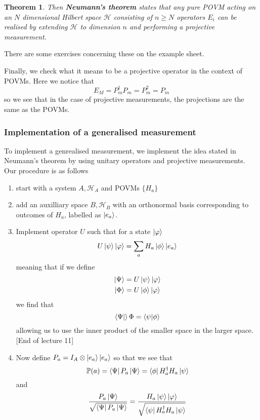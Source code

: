 \documentclass{article}
\newtheorem{theorem}{Theorem}
\theoremstyle{definition}
\begin{document}
\begin{theorem}
  Then \textbf{Neumann's theorem} states that any pure POVM acting on an $N$ 
  dimensional Hilbert space $\mathcal{H}$ consisting of $n \geq N$ operators 
  $E_i$ can be realised by extending $\mathcal{H}$ to dimension $n$ and
  performing a projective measurement.
\end{theorem}
There are some exercises concerning these on the example sheet.

Finally, we check what it means to be a projective operator in the context of 
POVMs. Here we notice that
\begin{equation}
  E_M = P_m^\dagger P_m = P_m^2 = P_m
\end{equation}
so we see that in the case of projective measurements, the projections are the 
same as the POVMs.

\subsubsection{Implementation of a generalised measurement}

To implement a genrealised measurement, we implement the idea stated in 
Neumann's theorem by using unitary operators and projective measurements.
Our procedure is as follows
\begin{enumerate}
  \item start with a system $A, \mathcal{H}_A$ and POVMs $\{H_a\}$
  \item add an auxilliary space $B, \mathcal{H}_B$ with an orthonormal basis
    corresponding to outcomes of $H_a$, labelled as $\ket{e_a}$.
  \item Implement operator $U$ such that for a state $\ket\varphi$ 
    \begin{equation}
      U \ket\psi \ket\varphi = \sum_a H_a \ket\phi \ket{e_a}
    \end{equation}
    meaning that if we define
    \begin{align}
      \ket\Psi &= U\ket\psi \ket\varphi \\
      \ket\Phi &= U\ket\phi \ket\varphi
    \end{align}
    we find that
    \begin{equation}
      \bra\Psi \ket\Phi = \bra\psi \ket{\phi}
    \end{equation}
    allowing us to use the inner product of the smaller space in the larger
    space. [End of lecture 11]
  \item Now define $P_a = I_A \otimes \ket{e_a} \ket{e_a}$ so that we see that
    \begin{equation}
      \mathbb{P}(a) = \bra\Psi P_a \ket\Psi = \bra\phi H_a^\dagger H_a \ket\psi
    \end{equation}
    and
    \begin{equation}
      \frac{P_a \ket\Psi}{\sqrt{\bra\Psi P_a \ket\Psi}} = 
      \frac{H_a \ket\psi \ket\varphi}{\sqrt{\bra\psi H_a^\dagger H_a \ket\psi}}
    \end{equation}
\end{enumerate}
\end{document}
